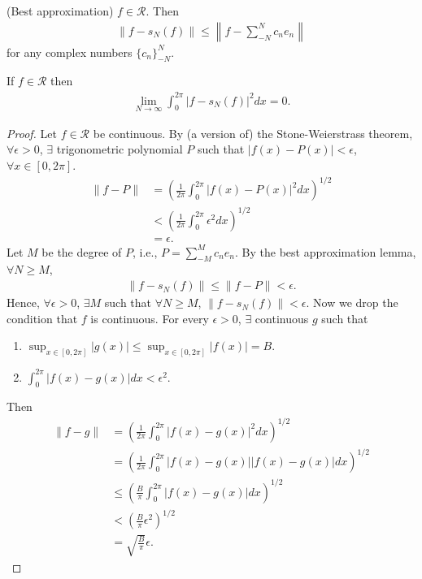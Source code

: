 \documentclass[11pt]{article}
\begin{document}
\begin{lemma} (Best approximation) $f \in \mathcal{R}$. Then \begin{align*} \| f - s_N(f) \| \le \left \| f - \sum_{-N}^N c_n e_n  \right\|
\end{align*}
for any complex numbers $\{ c_n \}_{-N}^N$.
\end{lemma}

\begin{theorem} If $f \in \mathcal{R}$ then \begin{align*} \lim_{N \to \infty} \int_0^{2\pi} |f - s_N(f) |^2 dx = 0.
\end{align*}
\end{theorem}
\begin{proof} Let $f \in \mathcal{R}$ be continuous. By (a version of) the Stone-Weierstrass theorem, $\forall \epsilon > 0$, $\exists$ trigonometric polynomial $P$ such that $|f(x) - P(x)| < \epsilon$, $\forall x \in [0, 2 \pi]$. \begin{align*} \| f - P \| & = \left( \frac{1}{2\pi} \int_0^{2\pi} |f(x) - P(x) |^2 dx  \right)^{1/2} \\ & <  \left( \frac{1}{2\pi} \int_0^{2\pi} \epsilon^2 dx  \right)^{1/2} \\ & = \epsilon.
\end{align*} Let $M$ be the degree of $P$, i.e., $P = \sum_{-M}^M c_n e_n$. By the best approximation lemma, $\forall N \ge M$, \begin{align*} \| f - s_N(f) \| \le \| f - P \| < \epsilon.
\end{align*} Hence, $\forall \epsilon > 0$, $\exists M$ such that $\forall N \ge M$, $\| f - s_N(f) \| < \epsilon$.
Now we drop the condition that $f$ is continuous. For every $\epsilon > 0$, $\exists$ continuous $g$ such that \begin{enumerate}
\item $\sup_{x \in [0, 2 \pi]} |g(x)| \le \sup_{x \in [0, 2\pi]} |f(x)| = B$.
\item $\int_0^{2\pi} |f(x) - g(x) | dx < \epsilon^2$.
\end{enumerate} Then \begin{align*} \| f - g \| & = \left( \frac{1}{2\pi} \int_0^{2\pi} |f(x) - g(x) |^2 dx  \right)^{1/2} \\ & = \left( \frac{1}{2\pi} \int_0^{2\pi} |f(x) - g(x) | |f(x) - g(x) |dx  \right)^{1/2} \\ & \le \left( \frac{B}{\pi} \int_0^{2\pi} |f(x) - g(x) | dx \right)^{1/2} \\ & < \left( \frac{B}{\pi} \epsilon^2 \right)^{1/2} \\ & = \sqrt{\frac{B}{\pi}} \epsilon.

\end{align*}
\end{proof}
\end{document}

